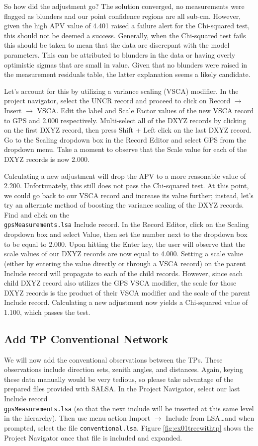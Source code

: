 So how did the adjustment go? The solution converged, no measurements were flagged as blunders and our point confidence regions are all sub-cm. However, given the high APV value of 4.401 raised a failure alert for the Chi-squared test, this should not be deemed a success. Generally, when the Chi-squared test fails this should be taken to mean that the data are discrepant with the model parameters. This can be attributed to blunders in the data or having overly optimistic sigmas that are small in value. Given that no blunders were raised in the measurement residuals table, the latter explanation seems a likely candidate.

Let's account for this by utilizing a variance scaling (VSCA) modifier. In the project navigator, select the UNCR record and proceed to click on Record $\to$ Insert $\to$ VSCA. Edit the label and Scale Factor values of the new VSCA record to GPS and 2.000 respectively. Multi-select all of the DXYZ records by clicking on the first DXYZ record, then press Shift + Left click on the last DXYZ record. Go to the Scaling dropdown box in the Record Editor and select GPS from the dropdown menu. Take a moment to observe that the Scale value for each of the DXYZ records is now 2.000.

Calculating a new adjustment will drop the APV to a more reasonable value of 2.200. Unfortunately, this still does not pass the Chi-squared test. At this point, we could go back to our VSCA record and increase its value further; instead, let's try an alternate method of boosting the variance scaling of the DXYZ records. Find and click on the \\\verb+gpsMeasurements.lsa+ Include record. In the Record Editor, click on the Scaling dropdown box and select Value, then set the number next to the dropdown box to be equal to 2.000. Upon hitting the Enter key, the user will observe that the scale values of our DXYZ records are now equal to 4.000. Setting a scale value (either by entering the value directly or through a VSCA record) on the parent Include record will propagate to each of the child records. However, since each child DXYZ record also utilizes the GPS VSCA modifier, the scale for those DXYZ records is the product of their VSCA modifier and the scale of the parent Include record. Calculating a new adjustment now yields a Chi-squared value of 1.100, which passes the test.

\subsection{Add TP Conventional Network}
We will now add the conventional observations between the TPs.  These observations include direction sets, zenith angles, and distances.  Again, keying these data manually would be very tedious, so please take advantage of the prepared files provided with SALSA. In the Project Navigator, select our last Include record \\\verb+gpsMeasurements.lsa+ (so that the next include will be inserted at this same level in the hierarchy).  Then use menu action Import $\to$ Include from LSA\ldots  and when prompted, select the file \verb+conventional.lsa+.  Figure \ref{fig:ex01treewithtp} shows the Project Navigator once that file is included and expanded.

